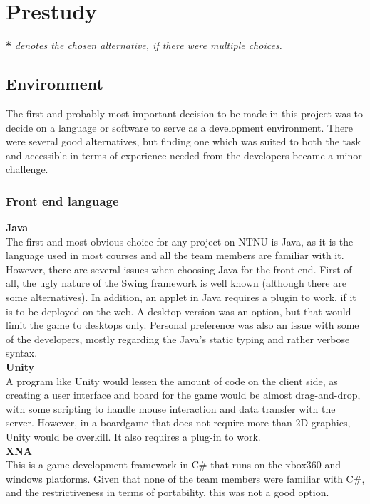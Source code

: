 \section{Prestudy}
\textbf{*} \emph{denotes the chosen alternative, if there were multiple choices.}

\subsection{Environment}
The first and probably most important decision to be made in this project was to decide on a language or software to serve as a development environment. There were several good alternatives, but finding one which was suited to both the task and accessible in terms of experience needed from the developers became a minor challenge.


\subsubsection{Front end language}
\textbf{Java}\\
The first and most obvious choice for any project on NTNU is Java, as it is the language used in most courses and all the team members are familiar with it. However, there are several issues when choosing Java for the front end. First of all, the ugly nature of the Swing framework is well known (although there are some alternatives). In addition, an applet in Java requires a plugin to work, if it is to be deployed on the web. A desktop version was an option, but that would limit the game to desktops only. Personal preference was also an issue with some of the developers, mostly regarding the Java’s static typing and rather verbose syntax.
\\ \newline
\textbf{Unity}\\
A program like Unity would lessen the amount of code on the client side, as creating a user interface and board for the game would be almost drag-and-drop, with some scripting to handle mouse interaction and data transfer with the server. However, in a boardgame that does not require more than 2D graphics, Unity would be overkill. It also requires a plug-in to work.
\\ \newline
\textbf{XNA}\\
This is a game development framework in C\# that runs on the xbox360 and windows platforms. Given that none of the team members were familiar with C\#, and the restrictiveness in terms of portability, this was not a good option.

